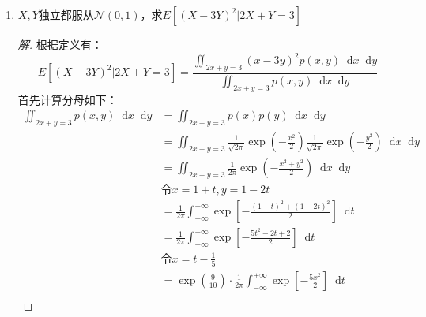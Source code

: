\documentclass[12pt]{article}
\newcommand{\hei}{\CJKfamily{hei}}                          %
\newcommand*{\dif}{\mathop{}\!\mathrm{d}}
\begin{document}
\begin{enumerate}
\item {\hei $X,Y$独立都服从$\mathcal{N}(0,1)$，求$E[(X-3Y)^2|2X+Y=3]$}
\begin{proof}[解]
	根据定义有：
	\begin{equation}
	E[(X-3Y)^2|2X+Y=3]=\frac{\iint_{2x+y=3}(x-3y)^2p(x,y)\dif x\dif y}{\iint_{2x+y=3}p(x,y)\dif x\dif y}
	\end{equation}
	首先计算分母如下：
	\begin{equation}
	\begin{aligned}
	\iint_{2x+y=3}p(x,y)\dif x\dif y&=\iint_{2x+y=3}p(x)p(y)\dif x\dif y \\
	&=\iint_{2x+y=3}\frac{1}{\sqrt{2\pi}}\exp\left(-\frac{x^2}{2}\right)\frac{1}{\sqrt{2\pi}}\exp\left(-\frac{y^2}{2}\right)\dif x\dif y \\
	&=\iint_{2x+y=3}\frac{1}{2\pi}\exp\left(-\frac{x^2+y^2}{2}\right)\dif x\dif y \\
	&\mbox{令}x=1+t,y=1-2t \\
	&=\frac{1}{2\pi}\int_{-\infty}^{+\infty}\exp\left[-\frac{(1+t)^2+(1-2t)^2}{2}\right]\dif t \\
	&=\frac{1}{2\pi}\int_{-\infty}^{+\infty}\exp\left[-\frac{5t^2-2t+2}{2}\right]\dif t \\
	&\mbox{令}x=t-\frac{1}{5}\\
	&=\exp\left(\frac{9}{10}\right)\cdot \frac{1}{2\pi}\int_{-\infty}^{+\infty}\exp\left[-\frac{5x^2}{2}\right]\dif t \\

\end{aligned}
\end{equation}
\end{proof}
\end{enumerate}
\end{document}
